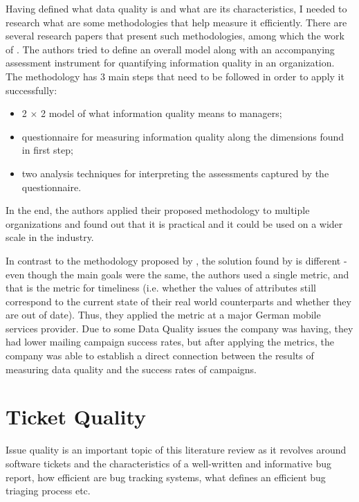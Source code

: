 \documentclass[11pt,english,twocolumn]{article}
\begin{document}
Having defined what data quality is and what are its characteristics, I needed
to research what are some methodologies that help measure it efficiently.
There are several research papers that present such methodologies, among which the 
work of \cite{lee2002aimq}. The authors tried to define an overall model along 
with an accompanying assessment instrument for quantifying information quality 
in an organization. The methodology has 3 main steps that need to be followed 
in order to apply it successfully:
  \begin{itemize}
    \item 2 $\times$ 2 model of what information quality means to managers;
    \item questionnaire for measuring information quality along the dimensions
    found in first step;
    \item two analysis techniques for interpreting the assessments captured 
    by the questionnaire.
  \end{itemize} 
In the end, the authors applied their proposed methodology to multiple organizations
and found out that it is practical and it could be used on a wider scale in the 
industry.

In contrast to the methodology proposed by \cite{lee2002aimq}, the solution found
by \cite{Heinrich2007MetricsDataQuality} is different - even though the 
main goals were the same, the authors used a single metric, and that is 
the metric for timeliness (i.e. whether the values of attributes still 
correspond to the current state of their real world counterparts and whether 
they are out of date). Thus, they applied the metric at a major German mobile 
services provider. Due to some Data Quality issues the company was having, they 
had lower mailing campaign success rates, but after applying the metrics, the 
company was able to establish a direct connection between the results of
measuring data quality and the success rates of campaigns.

\section{Ticket Quality}
\label{sec:ticket-quality}

Issue quality is an important topic of this literature review as it revolves around
software tickets and the characteristics of a well-written and 
informative bug report, how efficient are bug tracking systems, what defines
an efficient bug triaging process etc. 
\end{document}
